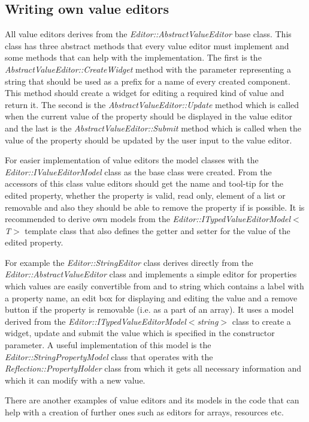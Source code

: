 \subsection{Writing own value editors}

All value editors derives from the \emph{Editor::AbstractValueEditor} base class. This class has three abstract methods that every value editor must implement and some methods that can help with the implementation. The first is the \emph{AbstractValueEditor::CreateWidget} method with the parameter representing a string that should be used as a prefix for a name of every created component. This method should create a widget for editing a required kind of value and return it. The second is the \emph{AbstractValueEditor::Update} method which is called when the current value of the property should be displayed in the value editor and the last is the \emph{AbstractValueEditor::Submit} method which is called when the value of the property should be updated by the user input to the value editor.

For easier implementation of value editors the model classes with the \emph{Editor::IValueEditorModel} class as the base class were created. From the accessors of this class value editors should get the name and tool-tip for the edited property, whether the property is valid, read only, element of a list or removable and also they should be able to remove the property if is possible. It is recommended to derive own models from the \emph{Editor::ITypedValueEditor\-Model$<$T$>$} template class that also defines the getter and setter for the value of the edited property.

For example the \emph{Editor::StringEditor} class derives directly from the \emph{Editor::AbstractValueEditor} class and implements a simple editor for properties which values are easily convertible from and to string which contains a label with a property name, an edit box for displaying and editing the value and a remove button if the property is removable (i.e. as a part of an array). It uses a model derived from the \emph{Editor::ITypedValueEditorModel$<$string$>$} class to create a widget, update and submit the value which is specified in the constructor parameter. A useful implementation of this model is the \emph{Editor::StringPropertyModel} class that operates with the \emph{Reflection::Property\-Holder} class from which it gets all necessary information and which it can modify with a new value.

There are another examples of value editors and its models in the code that can help with a creation of further ones such as editors for arrays, resources etc.

